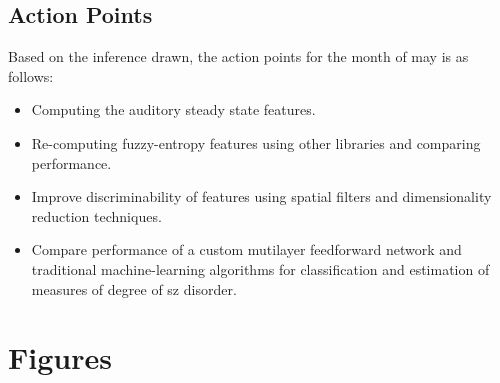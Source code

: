 \documentclass[10pt]{article}
\begin{document}
\subsection{Action Points}
Based on the inference drawn, the action points for the month of may is as follows:
\begin{itemize}
  \item Computing the auditory steady state features.
  \item Re-computing fuzzy-entropy features using other libraries and 
  comparing performance.
  \item Improve discriminability of features using spatial filters and dimensionality 
  reduction techniques.
  \item Compare performance of a custom mutilayer feedforward network and traditional 
  machine-learning algorithms for classification and estimation of measures of degree 
  of \gls{sz} disorder.
\end{itemize}

\section{Figures}\label{figures}
\end{document}
